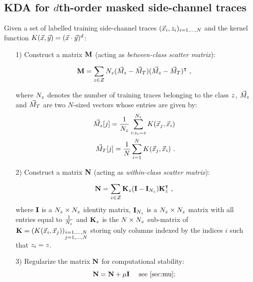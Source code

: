 \subsection{KDA for $d$th-order masked side-channel traces}\label{sec:KDA}
Given a set of labelled training side-channel traces $(\vLeakVec_i, \sensVar_i)_{i=1, \dots , \nbTraces}$ and the kernel function $K(\vLeakVec,\yyy)= (\vLeakVec \cdot \yyy)^d$:
\begin{itemize}

\item[1)] Construct a matrix $\MMM$ (acting as \emph{between-class scatter matrix}):

\begin{equation}
\MMM = \sum_{\sensVar\in\sensVarSet}\nbTracesPerClass(\MMMclass - \MMMT)(\MMMclass-\MMMT)^\intercal\mbox{ ,}
\end{equation}

where $\nbTracesPerClass$ denotes the number of training traces belonging to the class $\sensVar$,  $\MMMclass$ and $\MMMT$ are two $N$-sized vectors whose entries are given by:
\begin{align}
\MMMclass[\sensVar][j] = \frac{1}{\nbTracesPerClass}\sum_{i:\sensVar_i=\sensVar}^{\nbTracesPerClass}K(\vLeakVec_j,\vLeakVec_i)\\
\MMMT[j] = \frac{1}{\nbTraces}\sum_{i=1}^{\nbTraces}K(\vLeakVec_{j},\vLeakVec_{i}) \mbox{ .}
\end{align}


\item[2)] Construct a matrix $\NNN$ (acting as \emph{within-class scatter matrix}):

\begin{equation}\label{eq:N}
\NNN = \sum_{\sensVar\in\sensVarSet}\kernelMatrix_\sensVar(\III - \III_{\nbTracesPerClass})\kernelMatrix_\sensVar^\intercal\mbox{ ,}
\end{equation}
where $\III$ is a $\nbTracesPerClass \times \nbTracesPerClass$ identity matrix, $\III_{\nbTracesPerClass}$ is a $\nbTracesPerClass \times \nbTracesPerClass$ matrix with all entries equal to $\frac{1}{\nbTracesPerClass}$ and $\kernelMatrix_{\sensVar}$ is the $\nbTraces \times \nbTracesPerClass$ sub-matrix of $\kernelMatrix = (K(\vLeakVec_i,\vLeakVec_j))_{\substack{i=1,\dots,\nbTraces \\ j=1,\dots,\nbTraces}}$ storing only columns indexed by the indices $i$ such that $\sensVar_i=\sensVar$. 

\item[3)] Regularize the  matrix $\NNN$ for computational stability:
\begin{equation}\label{eq:mu}
\NNN = \NNN + \mu  \III \quad \mbox{ see \ref{sec:mu};}
\end{equation}


\end{itemize}
